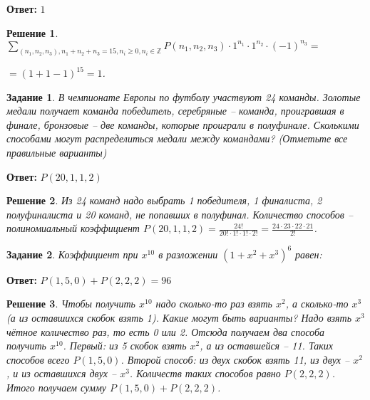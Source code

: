 \documentclass[a4paper,oneside]{memoir}
\newtheorem{task}{Задание}
\newtheorem{solution}{Решение}
\begin{document}
\textbf{Ответ:} $ 1 $

\begin{solution}
$ \sum\limits_{(n_1,n_2,n_3), n_1+n_2+n_3=15, n_i \geq 0, n_i \in \mathbb{Z}} P(n_1,n_2,n_3) \cdot 1^{n_1} \cdot 1^{n_2} \cdot (-1)^{n_3} = $

\begin{center}
	$= (1+1-1)^{15} = 1 $.
\end{center}
\end{solution}

\hrulefill

\begin{task}
	В чемпионате Европы по футболу участвуют 24 команды. Золотые медали получает команда победитель, серебряные -- команда, проигравшая в финале, бронзовые -- две команды, которые проиграли в полуфинале. Сколькими способами могут распределиться медали между командами? (Отметьте все правильные варианты)
\end{task}

\textbf{Ответ:} $ P(20,1,1,2) $

\begin{solution}
	Из 24 команд надо выбрать 1 победителя, 1 финалиста, 2 полуфиналиста и 20 команд, не попавших в полуфинал. Количество способов -- полиномиальный коэффициент $ P(20,1,1,2) =  \frac{24!}{20! \cdot 1! \cdot 1! \cdot 2!} = \frac{24 \cdot 23 \cdot 22 \cdot 21}{2!} $.
\end{solution}

\hrulefill

\begin{task}
	Коэффициент при $ x^{10} $ в разложении $ (1+x^2+x^3)^6 $ равен:
\end{task}

\textbf{Ответ:} $ P(1,5,0) + P(2,2,2) = 96 $

\begin{solution}
	Чтобы получить $ x^{10} $ надо сколько-то раз взять $ x^2 $, а сколько-то $ x^3 $ (а из оставшихся скобок взять 1). Какие могут быть варианты? Надо взять $ x^3 $ чётное количество раз, то есть 0 или 2. Отсюда получаем два способа получить $ x^{10} $. Первый: из 5 скобок взять $ x^2 $, а из оставшейся -- 11. Таких способов всего $ P(1,5,0) $. Второй способ: из двух скобок взять 11, из двух -- $ x^2 $, и из оставшихся двух -- $ x^3 $. Количеств таких способов равно $ P(2,2,2) $. Итого получаем сумму $ P(1,5,0) + P(2,2,2) $.
\end{solution}
\end{document}
